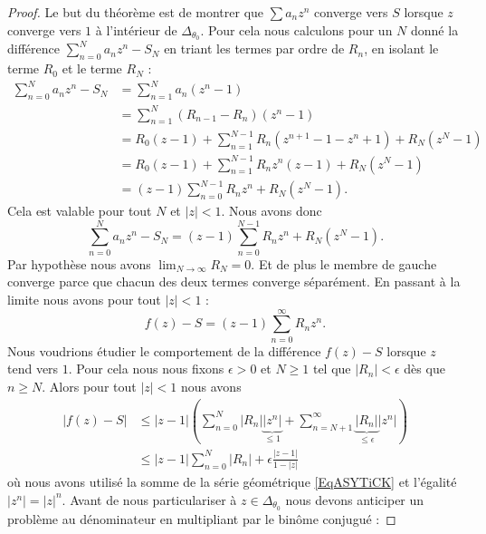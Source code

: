 \begin{proof}
	Le but du théorème est de montrer que \( \sum a_nz^n\) converge vers \( S\) lorsque \( z\) converge vers \( 1\) à l'intérieur de \( \Delta_{\theta_0}\). Pour cela nous calculons pour un \( N\) donné la différence \( \sum_{n=0}^{N}a_nz^n-S_N\) en triant les termes par ordre de \( R_n\), en isolant le terme \( R_0\) et le terme \( R_N\) :
	\begin{subequations}
		\begin{align}
			\sum_{n=0}^Na_nz^n-S_N & =\sum_{n=1}^Na_n(z^n-1)                                   \\
			                       & =\sum_{n=1}^N(R_{n-1}-R_n)(z^n-1)                         \\
			                       & =R_0(z-1)+\sum_{n=1}^{N-1}R_n(z^{n+1}-1-z^n+1)+R_N(z^N-1) \\
			                       & =R_0(z-1)+\sum_{n=1}^{N-1}R_nz^n(z-1)+R_N(z^N-1)          \\
			                       & =(z-1)\sum_{n=0}^{N-1}R_nz^n+R_N(z^N-1).
		\end{align}
	\end{subequations}
	Cela est valable pour tout \( N\) et \( | z |<1\). Nous avons donc
	\begin{equation}
		\sum_{n=0}^Na_nz^n-S_N=(z-1)\sum_{n=0}^{N-1}R_nz^n+R_N(z^N-1).
	\end{equation}
	Par hypothèse nous avons \( \lim_{N\to \infty} R_N=0\). Et de plus le membre de gauche converge parce que chacun des deux termes converge séparément. En passant à la limite nous avons pour tout \( | z |<1\) :
	\begin{equation}
		f(z)-S=(z-1)\sum_{n=0}^{\infty}R_nz^n.
	\end{equation}
	Nous voudrions étudier le comportement de la différence \( f(z)-S\) lorsque \( z\) tend vers \( 1\). Pour cela nous nous fixons \( \epsilon>0\) et \( N\geq 1\) tel que \( | R_n |<\epsilon\) dès que \( n\geq N\). Alors pour tout \( | z |<1\) nous avons
	\begin{subequations}
		\begin{align}
			| f(z)-S | & \leq | z-1 |\left( \sum_{n=0}^N| R_n | \underbrace{|z^n |}_{\leq 1} +\sum_{n=N+1}^{\infty}\underbrace{| R_n |}_{\leq \epsilon} |z^n | \right) \\
			           & \leq | z-1 |\sum_{n=0}^N| R_n |+\epsilon\frac{ | z-1 | }{ 1-| z | }
		\end{align}
	\end{subequations}
	où nous avons utilisé la somme de la série géométrique \eqref{EqASYTiCK} et l'égalité \( | z^n |=| z |^n\). Avant de nous particulariser à \( z\in\Delta_{\theta_0}\) nous devons anticiper un problème au dénominateur en multipliant par le binôme conjugué :

\end{proof}

